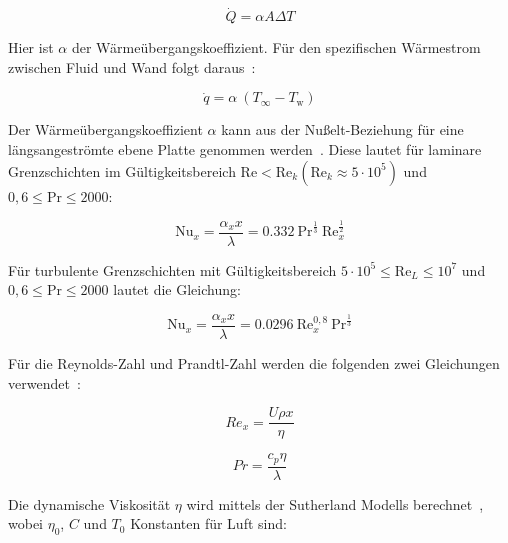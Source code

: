 \begin{equation}
    \dot{Q}=\alpha A \Delta T 
\end{equation}

Hier ist $\alpha$ der Wärmeübergangskoeffizient.
Für den spezifischen Wärmestrom zwischen Fluid und Wand folgt daraus~\cite{Weigand-2022}:

\begin{equation}
  \label{eq:qdot_freestream}
  \dot{q} = \alpha \ (T_{\infty} - T_\text{w})
\end{equation}

Der Wärmeübergangskoeffizient $\alpha$ kann aus der Nußelt-Beziehung für eine längsangeströmte ebene Platte genommen werden~\cite{Weigand-2022}. Diese lautet
für laminare Grenzschichten im Gültigkeitsbereich $\text{Re} < \text{Re}_k \left(\text{Re}_k \approx 5 \cdot 10^5\right)$ und $0,6 \leq \text{Pr} \leq 2000$:

\begin{equation}
  \label{eq:nusselt_laminar}
  \text{Nu}_x = \frac{\alpha_x x}{\lambda} = \num{0,332} \ \text{Pr}^{\frac{1}{3}} \ \text{Re}_x^{\frac{1}{2}}
\end{equation}

Für turbulente Grenzschichten mit Gültigkeitsbereich $5 \cdot 10^5 \leq \text{Re}_L \leq 10^7$ und $ 0,6 \leq \text{Pr} \leq 2000$ lautet die Gleichung:

\begin{equation}
  \label{eq:nusselt_turbulent}
  \text{Nu}_x = \frac{\alpha_x x}{\lambda} = \num{0,0296} \ \text{Re}_x^{0,8} \ \text{Pr}^{\frac{1}{3}}
\end{equation}

Für die Reynolds-Zahl und Prandtl-Zahl werden die folgenden zwei Gleichungen verwendet~\cite{Weigand-2022}:

\noindent\begin{minipage}{.5\linewidth}
  \begin{equation}
    \label{eq:reynolds}
    Re_x = \frac{U \rho x}{\eta}
  \end{equation}
\end{minipage}%
\begin{minipage}{.5\linewidth}
  \begin{equation}
    \label{eq:prandtl}
    Pr = \frac{c_p \eta}{\lambda}
  \end{equation}
\end{minipage}

Die dynamische Viskosität $\eta$ wird mittels der Sutherland Modells berechnet~\cite{Anderson-2017}, wobei $\eta_0$, $C$ und $T_0$ Konstanten für Luft sind:

